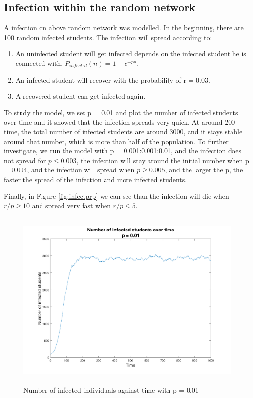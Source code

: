 \documentclass[12pt]{article}
\begin{document}
\newpage
\subsection{Infection within the random network}

A infection on above random network was modelled. In the beginning, there are 100 random infected students. The infection will spread according to:

\begin{enumerate}
\item An uninfected student will get infected depends on the infected student he is connected with. $P_{infected}(n) = 1 - e^{-pn}$.  
\item An infected student will recover with the probability of r = 0.03.
\item A recovered student can get infected again. 
\end{enumerate}

To study the model, we set p = 0.01 and plot the number of infected students over time and it showed that the infection spreads very quick. At around 200 time, the total number of infected students are around 3000, and it stays stable around that number, which is more than half of the population. To further investigate, we run the model with p = 0.001:0.001:0.01, and the infection does not spread for $p \leq 0.003$, the infection will stay around the initial number when p = 0.004, and the infection will spread when $p \geq 0.005$, and the larger the p, the faster the spread of the infection and more infected students. \par

Finally, in Figure \ref{fig:infectprp} we can see than the infection will die when $r/p \geq 10$ and spread very fast when $r/p \leq 5$.

\begin{figure}[H] %
\centering
\includegraphics[width = 12 cm, height = 9cm]{infectp001.png}
\caption{Number of infected individuals against time with p = 0.01}
\label{fig:infectp001}
\end{figure}
\end{document}
